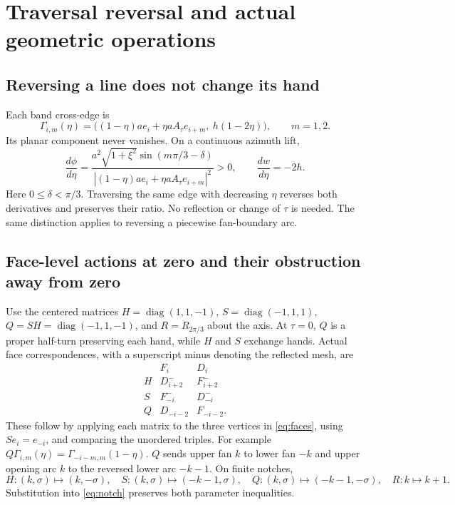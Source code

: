 \documentclass[11pt,a4paper]{article}
\numberwithin{equation}{section}
\newcommand{\abs}[1]{\left|#1\right|}
\newcommand{\diag}{\operatorname{diag}}
\begin{document}
\section{Traversal reversal and actual geometric operations}\label{sec:geomreverse}
\subsection{Reversing a line does not change its hand}
Each band cross-edge is
\[
\Gamma_{i,m}(\eta)=
\bigl((1-\eta)ae_i+\eta aA_\tau e_{i+m},\ h(1-2\eta)\bigr),
\qquad m=1,2.
\]
Its planar component never vanishes. On a continuous azimuth lift,
\begin{equation}\label{eq:edgeturn}
\frac{d\phi}{d\eta}
=\frac{a^2\sqrt{1+\xi^2}\sin(m\pi/3-\delta)}
{\abs{(1-\eta)ae_i+\eta aA_\tau e_{i+m}}^2}>0,\qquad
\frac{dw}{d\eta}=-2h.
\end{equation}
Here $0\leq\delta<\pi/3$. Traversing the same edge with decreasing $\eta$
reverses both derivatives and preserves their ratio. No reflection or
change of $\tau$ is needed. The same distinction applies to reversing a
piecewise fan-boundary arc.

\subsection{Face-level actions at zero and their obstruction away from zero}
Use the centered matrices
$H=\diag(1,1,-1)$, $S=\diag(-1,1,1)$,
$Q=SH=\diag(-1,1,-1)$, and $R=R_{2\pi/3}$ about the axis.
At $\tau=0$, $Q$ is a proper half-turn preserving each hand, while $H$ and
$S$ exchange hands. Actual face correspondences, with a superscript minus
denoting the reflected mesh, are
\begin{equation}\label{eq:faceactions}
\begin{array}{c|cc}
&F_i&D_i\\ \hline
H&D^-_{i+2}&F^-_{i+2}\\
S&F^-_{-i}&D^-_{-i}\\
Q&D_{-i-2}&F_{-i-2}.
\end{array}
\end{equation}
These follow by applying each matrix to the three vertices in
\eqref{eq:faces}, using $Se_i=e_{-i}$, and comparing the unordered triples.
For example $Q\Gamma_{i,m}(\eta)=\Gamma_{-i-m,m}(1-\eta)$.
$Q$ sends upper fan $k$ to lower fan $-k$ and upper opening arc $k$
to the reversed lower arc $-k-1$. On finite notches,
\[
H:(k,\sigma)\mapsto(k,-\sigma),\quad
S:(k,\sigma)\mapsto(-k-1,\sigma),\quad
Q:(k,\sigma)\mapsto(-k-1,-\sigma),\quad R:k\mapsto k+1.
\]
Substitution into \eqref{eq:notch} preserves both parameter inequalities.
\end{document}
